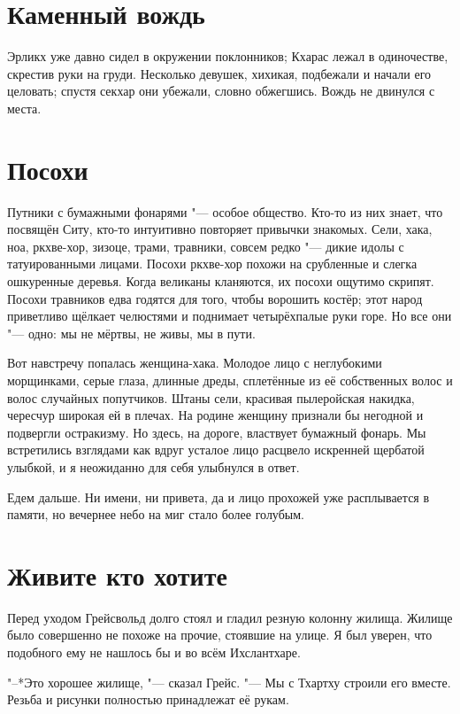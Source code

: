 \documentclass[a4paper,10pt]{book}
\newcommand{\ldotst}{\so{...}\xspace}
\begin{document}
 \section{Каменный вождь}

 Эрликх уже давно сидел в окружении поклонников; Кхарас лежал в одиночестве, скрестив руки на груди. Несколько девушек, хихикая, подбежали и начали его целовать; спустя секхар они убежали, словно обжегшись. Вождь не двинулся с места.
 
 \section{Посохи}

 
 Путники с бумажными фонарями "--- особое общество. Кто-то из них знает, что посвящён Ситу, кто-то интуитивно повторяет привычки знакомых. Сели, хака, ноа, ркхве-хор, зизоце, трами, травники, совсем редко "--- дикие идолы с татуированными лицами. Посохи ркхве-хор похожи на срубленные и слегка ошкуренные деревья. Когда великаны кланяются, их посохи ощутимо скрипят. Посохи травников едва годятся для того, чтобы ворошить костёр; этот народ приветливо щёлкает челюстями и поднимает четырёхпалые руки горе. Но все они "--- одно: мы не мёртвы, не живы, мы в пути.

Вот навстречу попалась женщина-хака. Молодое лицо с неглубокими морщинками, серые глаза, длинные дреды, сплетённые из её собственных волос и волос случайных попутчиков. Штаны сели, красивая пылеройская накидка, чересчур широкая ей в плечах. На родине женщину признали бы негодной и подвергли остракизму. Но здесь, на дороге, властвует бумажный фонарь. Мы встретились взглядами\ldotst как вдруг усталое лицо расцвело искренней щербатой улыбкой, и я неожиданно для себя улыбнулся в ответ.

Едем дальше. Ни имени, ни привета, да и лицо прохожей уже расплывается в памяти, но вечернее небо на миг стало более голубым.
 
\section{Живите кто хотите}

 Перед уходом Грейсвольд долго стоял и гладил резную колонну жилища. Жилище было совершенно не похоже на прочие, стоявшие на улице. Я был уверен, что подобного ему не нашлось бы и во всём Ихслантхаре.

"--*Это хорошее жилище, "--- сказал Грейс. "--- Мы с Тхартху строили его вместе. Резьба и рисунки полностью принадлежат её рукам.
\end{document}
